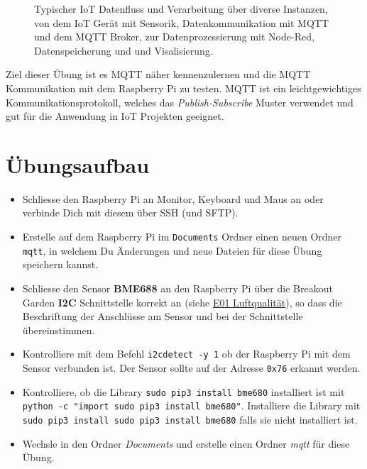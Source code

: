 \documentclass[
  11pt,
  a4paper,
  oneside, openany  ,captions=tableheading
]{scrbook}
\providecommand{\tightlist}{%
  \setlength{\itemsep}{0pt}\setlength{\parskip}{0pt}}
\theoremstyle{remark}
\renewcommand{\markright}[1]{\def\chaptertitle{#1}} %
\begin{document}
\begin{figure}


\caption{\label{fig-iotpipeline}Typischer IoT Datenfluss und
Verarbeitung über diverse Instanzen, von dem IoT Gerät mit Sensorik,
Datenkommunikation mit MQTT und dem MQTT Broker, zur Datenprozessierung
mit Node-Red, Datenspeicherung und und Visalisierung.}

\end{figure}%

Ziel dieser Übung ist es MQTT näher kennenzulernen und die MQTT
Kommunikation mit dem Raspberry Pi zu testen. MQTT ist ein
leichtgewichtiges Kommunikationsprotokoll, welches das
\emph{Publish-Subscribe} Muster verwendet und gut für die Anwendung in
IoT Projekten geeignet.

\section*{Übungsaufbau}\label{uxfcbungsaufbau-6}

\markright{Übungsaufbau}

\begin{itemize}
\tightlist
\item
  Schliesse den Raspberry Pi an Monitor, Keyboard und Maus an oder
  verbinde Dich mit diesem über SSH (und SFTP).
\item
  Erstelle auf dem Raspberry Pi im \texttt{Documents} Ordner einen neuen
  Ordner \texttt{mqtt}, in welchem Du Änderungen und neue Dateien für
  diese Übung speichern kannst.
\item
  Schliesse den Sensor \textbf{BME688} an den Raspberry Pi über die
  Breakout Garden \textbf{I2C} Schnittstelle korrekt an (siehe
  \href{E01_Luftqualitaet.qmd}{E01 Luftqualität}), so dass die
  Beschriftung der Anschlüsse am Sensor und bei der Schnittstelle
  übereinstimmen.
\item
  Kontrolliere mit dem Befehl \texttt{i2cdetect\ -y\ 1} ob der Raspberry
  Pi mit dem Sensor verbunden ist. Der Sensor sollte auf der Adresse
  \texttt{0x76} erkannt werden.
\item
  Kontrolliere, ob die Library \texttt{sudo\ pip3\ install\ bme680}
  installiert ist mit
  \texttt{python\ -c\ "import\ sudo\ pip3\ install\ bme680"}.
  Installiere die Library mit
  \texttt{sudo\ pip3\ install\ sudo\ pip3\ install\ bme680} falls sie
  nicht installiert ist.
\item
  Wechsle in den Ordner \emph{Documents} und erstelle einen Ordner
  \emph{mqtt} für diese Übung.
\end{itemize}
\end{document}
